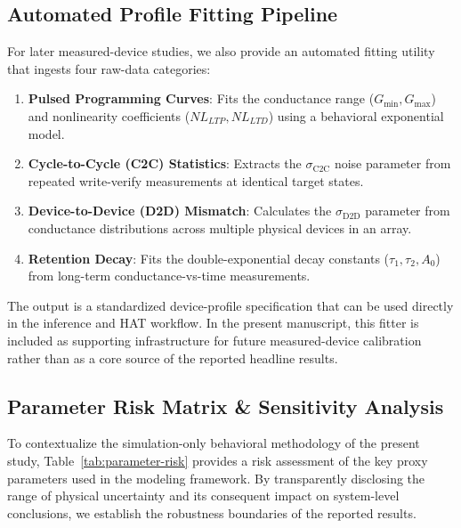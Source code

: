 

\subsection{Automated Profile Fitting Pipeline}

For later measured-device studies, we also provide an automated fitting utility that ingests four raw-data categories:
\begin{enumerate}
    \item \textbf{Pulsed Programming Curves}: Fits the conductance range ($G_{\min}, G_{\max}$) and nonlinearity coefficients ($NL_{LTP}, NL_{LTD}$) using a behavioral exponential model.
    \item \textbf{Cycle-to-Cycle (C2C) Statistics}: Extracts the $\sigma_{\mathrm{C2C}}$ noise parameter from repeated write-verify measurements at identical target states.
    \item \textbf{Device-to-Device (D2D) Mismatch}: Calculates the $\sigma_{\mathrm{D2D}}$ parameter from conductance distributions across multiple physical devices in an array.
    \item \textbf{Retention Decay}: Fits the double-exponential decay constants ($\tau_1, \tau_2, A_0$) from long-term conductance-vs-time measurements.
\end{enumerate}

The output is a standardized device-profile specification that can be used directly in the inference and HAT workflow. In the present manuscript, this fitter is included as supporting infrastructure for future measured-device calibration rather than as a core source of the reported headline results.

\subsection{Parameter Risk Matrix \& Sensitivity Analysis}
\label{subsec:parameter-risk-matrix}

To contextualize the simulation-only behavioral methodology of the present study, Table~\ref{tab:parameter-risk} provides a risk assessment of the key proxy parameters used in the modeling framework. By transparently disclosing the range of physical uncertainty and its consequent impact on system-level conclusions, we establish the robustness boundaries of the reported results.

